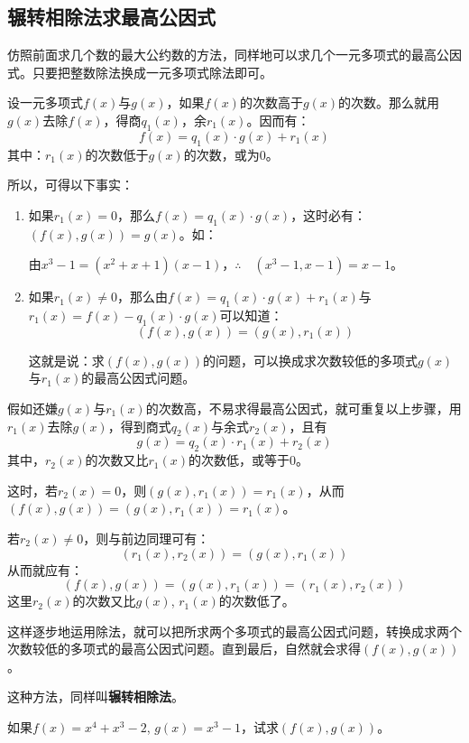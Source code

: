 \subsection{辗转相除法求最高公因式}
仿照前面求几个数的最大公约数的方法，同样地可以求几个一元多项式的最高公因式。只要把整数除法换成一元多项式除法即可。

设一元多项式$f(x)$与$g(x)$，如果$f(x)$的次数高于$g(x)$的次数。那么就用$g(x)$去除$f(x)$，得商$q_1(x)$，余$r_1(x)$。因而有：
\[f(x)=q_1(x)\cdot g(x)+r_1(x)\]
其中：$r_1(x)$的次数低于$g(x)$的次数，或为0。

所以，可得以下事实：
\begin{enumerate}
    \item 如果$r_1(x)=0$，那么$f(x)=q_1(x)\cdot g(x)$，这时必有：$(f(x),g(x))=g(x)$。如：
    
    由$x^3-1=(x^2+x+1)(x-1)$，$\therefore\quad (x^3-1,x-1)=x-1$。

\item 如果$r_1(x)\ne 0$，那么由$f(x)=q_1(x)\cdot g(x)+r_1(x)$与$r_1(x)=f(x)-q_1(x)\cdot g(x)$可以知道：
\[(f(x),g(x))=(g(x),r_1(x))\]

这就是说：求$(f(x),g(x))$的问题，可以换成求次数较低的多项式$g(x)$与$r_1(x)$的最高公因式问题。
\end{enumerate}


假如还嫌$g(x)$与$r_1(x)$的次数高，不易求得最高公因式，就可重复以上步骤，用$r_1(x)$去除$g(x)$，得到商式$q_2(x)$与余式$r_2(x)$，且有
\[g (x) =q_2 (x) \cdot r_1 (x) +r_2 (x) \]
其中，$r_2(x)$的次数又比$r_1(x)$的次数低，或等于0。

这时，若$r_2(x)=0$，则$(g(x),r_1(x))=r_1(x)$，从而$(f(x),g(x))=(g(x), r_1(x)) =r_1 (x)$。

若$r_2(x)\ne 0$，则与前边同理可有：
$$(r_1 (x), r_2(x))=(g(x),r_1(x))$$
从而就应有：
\[( f (x) ,g (x) ) = (g (x) ,r_1 (x))=(r_1(x),r_2(x))\]
这里$r_2(x)$的次数又比$g(x)$, $r_1(x)$的次数低了。

这样逐步地运用除法，就可以把所求两个多项式的最高公因式问题，转换成求两个次数较低的多项式的最高公因式问题。直到最后，自然就会求得$(f(x),g (x) )$。

这种方法，同样叫\textbf{辗转相除法}。



\begin{example}
如果$f(x)=x^4+x^3-2$, $g(x)=x^3-1$，试求$(f(x),g(x))$。
\end{example}


